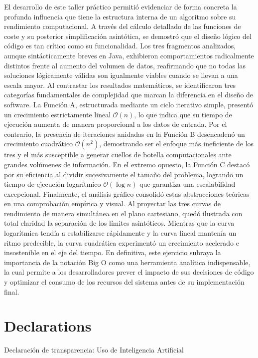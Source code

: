 \documentclass[pdflatex,sn-mathphys-num]{sn-jnl}%
\theoremstyle{thmstyleone}%
\theoremstyle{thmstyletwo}%
\theoremstyle{thmstylethree}%
\begin{document}
El desarrollo de este taller práctico permitió evidenciar de forma concreta la profunda influencia que tiene la estructura interna de un algoritmo sobre su rendimiento computacional. A través del cálculo detallado de las funciones de coste y su posterior simplificación asintótica, se demostró que el diseño lógico del código es tan crítico como su funcionalidad. Los tres fragmentos analizados, aunque sintácticamente breves en Java, exhibieron comportamientos radicalmente distintos frente al aumento del volumen de datos, reafirmando que no todas las soluciones lógicamente válidas 
son igualmente viables cuando se llevan a una escala mayor.
Al contrastar los resultados matemáticos, se identificaron tres categorías fundamentales de complejidad que marcan la diferencia en el diseño de software. La Función A, estructurada mediante un ciclo iterativo simple, presentó un crecimiento estrictamente lineal $\mathcal{O}(n)$, lo que indica que su tiempo de ejecución aumenta de manera proporcional a los datos de entrada. Por el contrario, la presencia de iteraciones anidadas en la Función B desencadenó un crecimiento cuadrático $\mathcal{O}(n^2)$, demostrando ser el enfoque más ineficiente de los tres y el más susceptible a 
generar cuellos de botella computacionales ante grandes volúmenes de información. En el extremo opuesto, la Función C destacó por su eficiencia al dividir sucesivamente el tamaño del problema, logrando un tiempo de ejecución logarítmico $\mathcal{O}(\log n)$ que garantiza una escalabilidad excepcional.
Finalmente, el análisis gráfico consolidó estas abstracciones teóricas en una comprobación empírica y visual. Al proyectar las tres curvas de rendimiento de manera simultánea en el plano cartesiano, quedó ilustrada con total claridad la separación de los límites asintóticos. Mientras que la curva logarítmica tendía a estabilizarse rápidamente y la curva lineal mantenía un ritmo predecible, la curva cuadrática experimentó un crecimiento acelerado e insostenible en el eje del tiempo. En definitiva, este ejercicio subraya la importancia de la notación Big O como una herramienta analítica indispensable, la cual permite a los desarrolladores prever el impacto de sus decisiones de código y optimizar el consumo de los recursos del sistema antes de su implementación final.

\section*{Declarations}

Declaración de transparencia: Uso de Inteligencia Artificial
\end{document}
